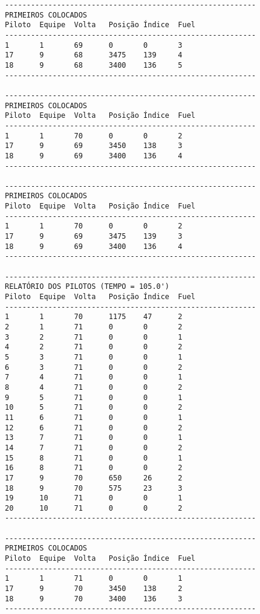 \documentclass[12pt]{article}
\begin{document}
\begin{verbatim}
----------------------------------------------------------
PRIMEIROS COLOCADOS
Piloto  Equipe  Volta   Posição Índice  Fuel
----------------------------------------------------------
1       1       69      0       0       3
17      9       68      3475    139     4
18      9       68      3400    136     5
----------------------------------------------------------

----------------------------------------------------------
PRIMEIROS COLOCADOS
Piloto  Equipe  Volta   Posição Índice  Fuel
----------------------------------------------------------
1       1       70      0       0       2
17      9       69      3450    138     3
18      9       69      3400    136     4
----------------------------------------------------------

----------------------------------------------------------
PRIMEIROS COLOCADOS
Piloto  Equipe  Volta   Posição Índice  Fuel
----------------------------------------------------------
1       1       70      0       0       2
17      9       69      3475    139     3
18      9       69      3400    136     4
----------------------------------------------------------

----------------------------------------------------------
RELATÓRIO DOS PILOTOS (TEMPO = 105.0')
Piloto  Equipe  Volta   Posição Índice  Fuel
----------------------------------------------------------
1       1       70      1175    47      2
2       1       71      0       0       2
3       2       71      0       0       1
4       2       71      0       0       2
5       3       71      0       0       1
6       3       71      0       0       2
7       4       71      0       0       1
8       4       71      0       0       2
9       5       71      0       0       1
10      5       71      0       0       2
11      6       71      0       0       1
12      6       71      0       0       2
13      7       71      0       0       1
14      7       71      0       0       2
15      8       71      0       0       1
16      8       71      0       0       2
17      9       70      650     26      2
18      9       70      575     23      3
19      10      71      0       0       1
20      10      71      0       0       2
----------------------------------------------------------

----------------------------------------------------------
PRIMEIROS COLOCADOS
Piloto  Equipe  Volta   Posição Índice  Fuel
----------------------------------------------------------
1       1       71      0       0       1
17      9       70      3450    138     2
18      9       70      3400    136     3
----------------------------------------------------------


\end{verbatim}
\end{document}
